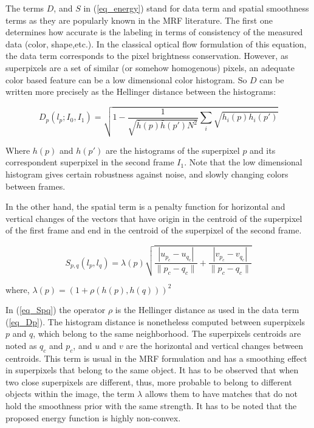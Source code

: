 The terms $D$, and $S$ in (\ref{eq_energy}) stand for data term and spatial smoothness terms as they
are popularly known in the MRF literature. The first one determines how accurate is the labeling in terms
of consistency of the measured data (color, shape,etc.). In the classical optical flow formulation of this equation,
the data term corresponds to the pixel brightness conservation\cite{c7}\cite{c5}. However, as superpixels are a set
of similar (or somehow homogenous) pixels, an adequate color based feature can be a low dimensional
color histogram. So $D$ can be written more precisely as the Hellinger distance between the histograms:

\begin{equation}
D_p(l_p;I_0,I_1) = \sqrt{ 1 - \frac{1}{\sqrt{\bar{h}(p)\bar{h}(p')N^2} } \sum_{i}\sqrt{h_{i}(p)h_{i}(p')} }
\label{eq_Dp}
\end{equation}

Where $h(p)$ and $h(p')$ are the histograms of the superpixel $p$ and its correspondent superpixel in the
second frame $I_1$. %
Note that the low dimensional histogram gives certain robustness against noise,
and slowly changing colors between frames. 

In the other hand, the spatial term is a penalty function for horizontal
and vertical changes of the vectors that have origin in the centroid of the superpixel of the first frame and
end in the centroid of the superpixel of the second frame.

\begin{equation}
S_{p,q}(l_p, l_q) = \lambda(p)
  \sqrt{\frac{|u_{p_c}-u_{q_c}|}{\|p_c-q_c\|}+ \frac{|v_{p_c}-v_{q_c}|}{\|p_c-q_c\|}}
\label{eq_Spq}
\end{equation}
\begin{center}
 where, $ \lambda(p) = (1 + \rho(h(p),h(q)))^2 $ \\
\end{center}

In (\ref{eq_Spq}) the operator $\rho$ is the Hellinger distance as used in the
data term (\ref{eq_Dp}). The histogram distance is nonetheless computed between superpixels $p$ and $q$, 
which belong to the same neighborhood. The superpixels centroids are noted as $q_c$ and $p_c$, 
and $u$ and $v$ are the horizontal and vertical changes between centroids.
This term is usual in the MRF formulation and has a smoothing effect in superpixels that belong to the
same object. It has to be observed that when two close superpixels are different, thus, more probable to
belong to different objects within the image, the term $\lambda$ allows them to have
matches that do not hold the smoothness prior with the same strength. 
It has to be noted that the proposed energy function is highly non-convex.


